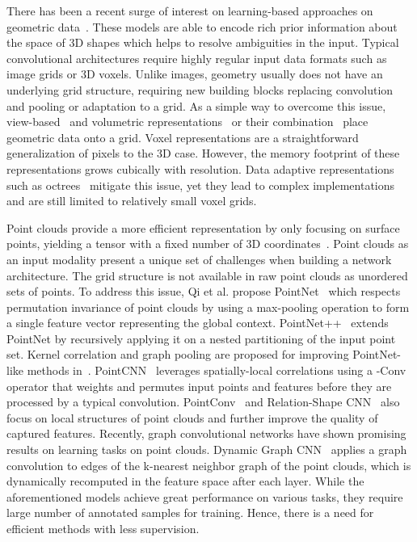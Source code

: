 \documentclass[10pt,twocolumn,letterpaper]{article}
\begin{document}
There has been a recent surge of interest on learning-based approaches on geometric data~\cite{brock2016generative,choy20163d,rezende2016unsupervised,wu2016learning,wu20153d}. These models are able to encode rich prior information about the space of 3D shapes which helps to resolve ambiguities in the input. 
Typical convolutional architectures require highly regular input data formats such as image grids or 3D voxels. 
Unlike images, geometry usually does not have an underlying grid structure, requiring new building blocks replacing convolution and pooling or adaptation to a grid. 
As a simple way to overcome this issue, view-based~\cite{su2015multi,wei2016dense,poursaeed2018deep}
and volumetric representations~\cite{klokov2017escape,maturana2015voxnet,tatarchenko2017octree,wu20153d} or their combination~\cite{qi2016volumetric} place geometric data onto a grid. 
Voxel representations are a straightforward generalization of pixels to the 3D case. However, the memory footprint of these representations grows cubically with resolution. Data adaptive representations such as octrees~\cite{riegler2017octnet,tatarchenko2017octree} mitigate this issue, yet they lead to complex implementations and are still limited to relatively small voxel grids. 

Point clouds provide a more efficient representation by only focusing on surface points, yielding a tensor with a fixed number of 3D coordinates~\cite{achlioptas2018learning,fan2017point}. 
Point clouds as an input modality present a unique set of challenges when building a network architecture. 
The grid structure is not available in raw point clouds as unordered sets of points. 
To address this issue, Qi et al. propose PointNet~\cite{qi2017pointnet} which respects permutation invariance of point clouds by using a max-pooling operation to form a single feature vector representing the global context. 
PointNet++~\cite{qi2017pointnet++} extends PointNet by recursively applying it on a nested partitioning of the input point set.
Kernel correlation and graph pooling are proposed for improving PointNet-like methods in~\cite{shen2018mining}. 
PointCNN~\cite{li2018pointcnn} leverages spatially-local correlations using a -Conv operator that weights and permutes input points and features before they are processed by a typical convolution. 
PointConv~\cite{wu2019pointconv} and Relation-Shape CNN~\cite{liu2019relation} also focus on local structures of point clouds and further improve the quality of captured features.
Recently, graph convolutional networks have shown promising results on learning tasks on point clouds.  
Dynamic Graph CNN~\cite{wang2019dynamic} applies a graph convolution to edges of the k-nearest neighbor graph of the point clouds, which is dynamically recomputed in the feature space after each layer. While the aforementioned models achieve great performance on various tasks, they require large number of annotated samples for training. Hence, there is a need for 
efficient methods with less supervision.     
\end{document}
